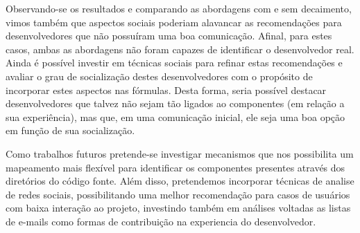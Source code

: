 \documentclass[oneside,brazil,a4paper]{normas-utf-tex}
\begin{document}
Observando-se os resultados e comparando as abordagens com e sem decaimento, vimos também que aspectos sociais poderiam alavancar as recomendações para desenvolvedores que não possuíram uma boa comunicação. Afinal, para estes casos, ambas as abordagens não foram capazes de identificar o desenvolvedor real. Ainda é possível investir em técnicas sociais para refinar estas recomendações e avaliar o grau de socialização destes desenvolvedores com o propósito de incorporar estes aspectos nas fórmulas. Desta forma, seria possível destacar desenvolvedores que talvez não sejam tão ligados ao componentes (em relação a sua experiência), mas que, em uma comunicação inicial, ele seja uma boa opção em função de sua socialização.


Como trabalhos futuros pretende-se investigar mecanismos que nos possibilita um mapeamento mais flexível para identificar os componentes presentes através dos diretórios do código fonte. Além disso, pretendemos incorporar técnicas de analise de redes sociais, possibilitando uma melhor recomendação para casos de usuários com baixa interação ao projeto, investindo também em análises voltadas as listas de e-mails como formas de contribuição na experiencia do desenvolvedor.




\clearpage %
\label{bibstart}
\label{bibend}
\end{document}
